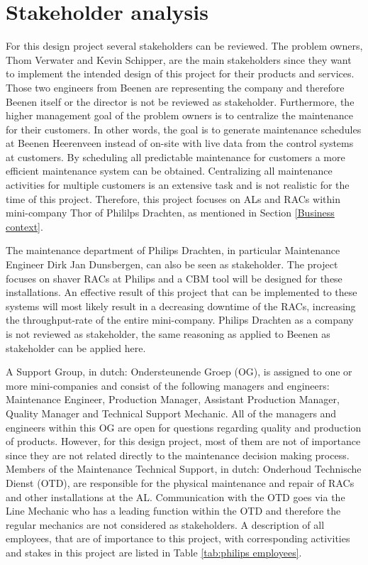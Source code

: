 \section{Stakeholder analysis} \label{Stakeholder analysis}
For this design project several stakeholders can be reviewed. The problem owners, Thom Verwater and Kevin Schipper, are the main stakeholders since they want to implement the intended design of this project for their products and services. Those two engineers from Beenen are representing the company and therefore Beenen itself or the director is not be reviewed as stakeholder. Furthermore, the higher management goal of the problem owners is to centralize the maintenance for their customers. In other words, the goal is to generate maintenance schedules at Beenen Heerenveen instead of on-site with live data from the control systems at customers. By scheduling all predictable maintenance for customers a more efficient maintenance system can be obtained. Centralizing all maintenance activities for multiple customers is an extensive task and is not realistic for the time of this project. Therefore, this project focuses on ALs and RACs within mini-company Thor of Phililps Drachten, as mentioned in Section \ref{Business context}.

The maintenance department of Philips Drachten, in particular Maintenance Engineer Dirk Jan Dunsbergen, can also be seen as stakeholder. The project focuses on shaver RACs at Philips and a CBM tool will be designed for these installations. An effective result of this project that can be implemented to these systems will most likely result in a decreasing downtime of the RACs, increasing the throughput-rate of the entire mini-company. Philips Drachten as a company is not reviewed as stakeholder, the same reasoning as applied to Beenen as stakeholder can be applied here. 

A Support Group, in dutch: Ondersteunende Groep (OG), is assigned to one or more mini-companies and consist of the following managers and engineers: Maintenance Engineer, Production Manager, Assistant Production Manager, Quality Manager and Technical Support Mechanic. All of the managers and engineers within this OG are open for questions regarding quality and production of products. However, for this design project, most of them are not of importance since they are not related directly to the maintenance decision making process. Members of the Maintenance Technical Support, in dutch: Onderhoud Technische Dienst (OTD), are responsible for the physical maintenance and repair of RACs and other installations at the AL. Communication with the OTD goes via the Line Mechanic who has a leading function within the OTD and therefore the regular mechanics are not considered as stakeholders. A description of all employees, that are of importance to this project, with corresponding activities and stakes in this project are listed in Table \ref{tab:philips employees}. 

